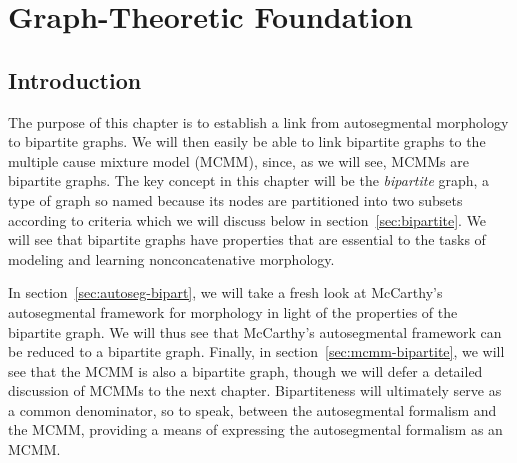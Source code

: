 \chapter{Graph-Theoretic Foundation}
\label{ch:graph}
\section{Introduction}
The purpose of this chapter is to
establish a link from autosegmental morphology to bipartite graphs. We will then easily be
able to link bipartite graphs to the multiple cause mixture model (MCMM), since, as we will see,
MCMMs are bipartite graphs.
The key concept in this chapter will be the \emph{bipartite} graph, 
a type of graph so named because its nodes are partitioned into two subsets according 
to criteria which we will discuss below in section~\ref{sec:bipartite}. 
We will see that bipartite graphs have properties that are essential 
to the tasks of modeling and learning nonconcatenative morphology.

In section~\ref{sec:autoseg-bipart}, we will take a fresh look at McCarthy's 
autosegmental framework for morphology \citep{mccarthy:1981} in light of the 
properties of the bipartite graph. We will thus see that 
McCarthy's 
autosegmental framework can be reduced to a bipartite graph.
Finally, in section~\ref{sec:mcmm-bipartite}, we will see that the MCMM is also a bipartite graph,
though we will defer a detailed discussion of MCMMs to the next chapter.
Bipartiteness will ultimately serve as a common denominator, so to speak, between the autosegmental formalism and the MCMM, providing a means of expressing the autosegmental formalism as an MCMM.
 

